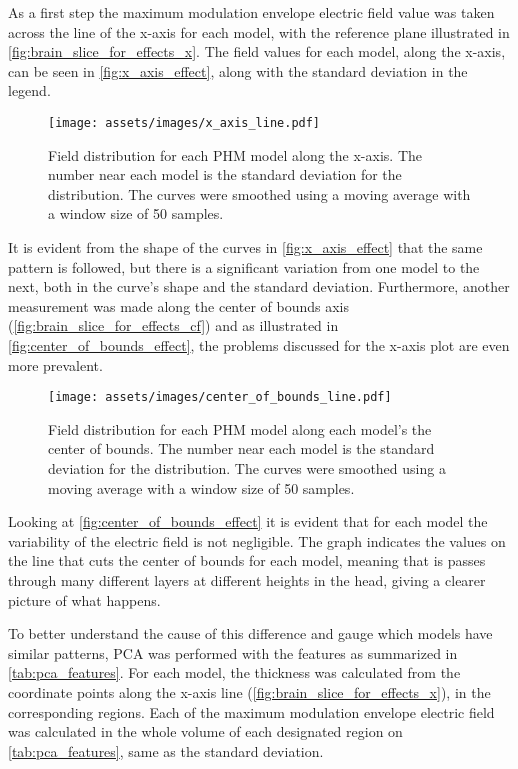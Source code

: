 As a first step the maximum modulation envelope electric field value was taken across the line of the x-axis for each model, with the reference plane illustrated in \autoref{fig:brain_slice_for_effects_x}. The field values for each model, along the x-axis, can be seen in \autoref{fig:x_axis_effect}, along with the standard deviation in the legend.

\begin{figure}[H]
    \centering
    \texttt{[image: assets/images/x\_axis\_line.pdf]}
    \caption{Field distribution for each \gls{PHM} model along the x-axis. The number near each model is the standard deviation for the distribution. The curves were smoothed using a moving average with a window size of 50 samples.}
    \label{fig:x_axis_effect}
\end{figure}

It is evident from the shape of the curves in \autoref{fig:x_axis_effect} that the same pattern is followed, but there is a significant variation from one model to the next, both in the curve's shape and the standard deviation. Furthermore, another measurement was made along the center of bounds axis (\autoref{fig:brain_slice_for_effects_cf}) and as illustrated in \autoref{fig:center_of_bounds_effect}, the problems discussed for the x-axis plot are even more prevalent.

\begin{figure}[H]
    \centering
    \texttt{[image: assets/images/center\_of\_bounds\_line.pdf]}
    \caption{Field distribution for each \gls{PHM} model along each model's the center of bounds. The number near each model is the standard deviation for the distribution. The curves were smoothed using a moving average with a window size of 50 samples.}
    \label{fig:center_of_bounds_effect}
\end{figure}

Looking at \autoref{fig:center_of_bounds_effect} it is evident that for each model the variability of the electric field is not negligible. The graph indicates the values on the line that cuts the center of bounds for each model, meaning that is passes through many different layers at different heights in the head, giving a clearer picture of what happens. 

To better understand the cause of this difference and gauge which models have similar patterns, \gls{PCA} was performed with the features as summarized in \autoref{tab:pca_features}. For each model, the thickness was calculated from the coordinate points along the x-axis line (\autoref{fig:brain_slice_for_effects_x}), in the corresponding regions. Each of the maximum modulation envelope electric field was calculated in the whole volume of each designated region on \autoref{tab:pca_features}, same as the standard deviation.

